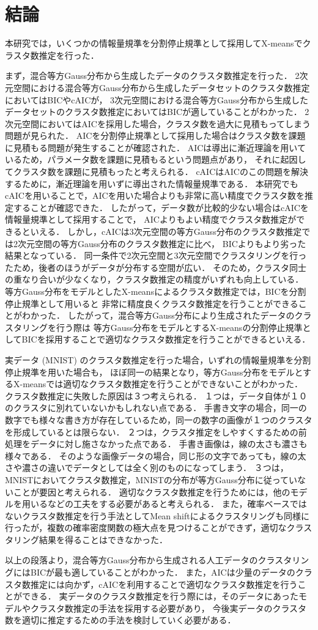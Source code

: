 \section{結論}

本研究では，いくつかの情報量規準を分割停止規準として採用してX-meansでクラスタ数推定を行った．

まず，混合等方Gauss分布から生成したデータのクラスタ数推定を行った．
2次元空間における混合等方Gauss分布から生成したデータセットのクラスタ数推定においてはBICやcAICが，
3次元空間における混合等方Gauss分布から生成したデータセットのクラスタ数推定においてはBICが適していることがわかった．
2次元空間においてはAICを採用した場合，クラスタ数を過大に見積もってしまう問題が見られた．
AICを分割停止規準として採用した場合はクラスタ数を課題に見積もる問題が発生することが確認された．
AICは導出に漸近理論を用いているため，パラメータ数を課題に見積もるという問題点があり，
それに起因してクラスタ数を課題に見積もったと考えられる．
cAICはAICのこの問題を解決するために，漸近理論を用いずに導出された情報量規準である．
本研究でもcAICを用いることで，AICを用いた場合よりも非常に高い精度でクラスタ数を推定することが確認できた．
したがって，データ数が比較的少ない場合はcAICを情報量規準として採用することで，
AICよりもよい精度でクラスタ数推定ができるといえる．
しかし，cAICは3次元空間の等方Gauss分布のクラスタ数推定では2次元空間の等方Gauss分布のクラスタ数推定に比べ，
BICよりもより劣った結果となっている．
同一条件で2次元空間と3次元空間でクラスタリングを行ったため，後者のほうがデータが分布する空間が広い．
そのため，クラスタ同士の重なり合いが少なくなり，クラスタ数推定の精度がいずれも向上している．
等方Gauss分布をモデルとしたX-meansによるクラスタ数推定では，BICを分割停止規準として用いると
非常に精度良くクラスタ数推定を行うことができることがわかった．
したがって，混合等方Gauss分布により生成されたデータのクラスタリングを行う際は
等方Gauss分布をモデルとするX-meansの分割停止規準としてBICを採用することで適切なクラスタ数推定を行うことができるといえる．

実データ (MNIST) のクラスタ数推定を行った場合，いずれの情報量規準を分割停止規準を用いた場合も，
ほぼ同一の結果となり，等方Gauss分布をモデルとするX-meansでは適切なクラスタ数推定を行うことができないことがわかった．
クラスタ数推定に失敗した原因は３つ考えられる．
１つは，データ自体が１０のクラスタに別れていないかもしれない点である．
手書き文字の場合，同一の数字でも様々な書き方が存在しているため，同一の数字の画像が１つのクラスタを形成しているとは限らない．
２つは，クラスタ推定をしやすくするための前処理をデータに対し施さなかった点である．
手書き画像は，線の太さも濃さも様々である．
そのような画像データの場合，同じ形の文字であっても，線の太さや濃さの違いでデータとしては全く別のものになってしまう．
３つは，MNISTにおいてクラスタ数推定，MNISTの分布が等方Gauss分布に従っていないことが要因と考えられる．
適切なクラスタ数推定を行うためには，他のモデルを用いるなどの工夫をする必要があると考えられる．
また，確率ベースではないクラスタ数推定を行う手法としてMean shiftによるクラスタリングも同様に行ったが，複数の確率密度関数の極大点を見つけることができず，適切なクラスタリング結果を得ることはできなかった．

以上の段落より，混合等方Gauss分布から生成される人工データのクラスタリングにはBICが最も適していることがわかった．
また，AICは少量のデータのクラスタ数推定には向かず，cAICを利用することで適切なクラスタ数推定を行うことができる．
実データのクラスタ数推定を行う際には，そのデータにあったモデルやクラスタ数推定の手法を採用する必要があり，
今後実データのクラスタ数を適切に推定するための手法を検討していく必要がある．
